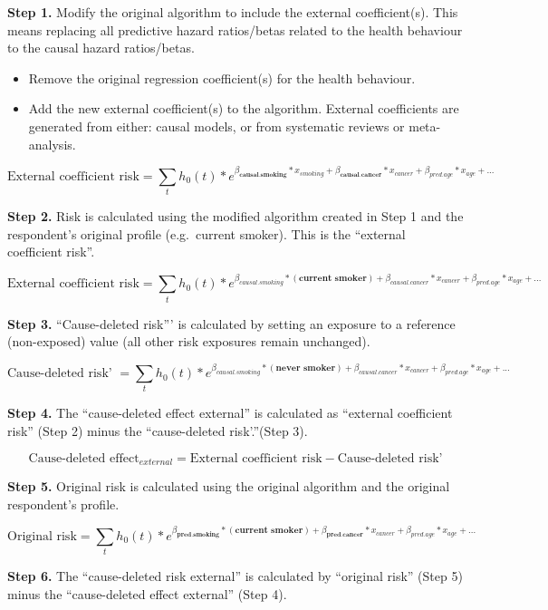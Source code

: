 \documentclass[]{book}
\providecommand{\tightlist}{%
  \setlength{\itemsep}{0pt}\setlength{\parskip}{0pt}}
\begin{document}
\textbf{Step 1.} Modify the original algorithm to include the external
coefficient(s). This means replacing all predictive hazard ratios/betas
related to the health behaviour to the causal hazard ratios/betas.

\begin{itemize}
\tightlist
\item
  Remove the original regression coefficient(s) for the health
  behaviour.
\item
  Add the new external coefficient(s) to the algorithm. External
  coefficients are generated from either: causal models, or from
  systematic reviews or meta-analysis.
\end{itemize}

\[ \text{External coefficient risk} = \sum_t h_0(t) * e^{{\beta_\textbf{causal.smoking}}*x_{smoking} + {{\beta_\textbf{causal.cancer}}}*x_{cancer} + \beta_{pred.age}*x_{age} +...}  \]

\textbf{Step 2.} Risk is calculated using the modified algorithm created
in Step 1 and the respondent's original profile (e.g.~current smoker).
This is the ``external coefficient risk''.

\[ \text{External coefficient risk} = \sum_t h_0(t) * e^{\beta_{causal.smoking}* {(\textbf{current smoker})} + \beta_{causal.cancer}*x_{cancer} + \beta_{pred.age}*x_{age} +...}  \]

\textbf{Step 3.} ``Cause-deleted risk''' is calculated by setting an
exposure to a reference (non-exposed) value (all other risk exposures
remain unchanged).

\[ \text{Cause-deleted risk' } = \sum_t h_0(t) * e^{\beta_{causal.smoking}* {(\textbf{never smoker})} + \beta_{causal.cancer}*x_{cancer} + \beta_{pred.age}*x_{age} +...}  \]

\textbf{Step 4.} The ``cause-deleted effect external'' is calculated as
``external coefficient risk'' (Step 2) minus the ``cause-deleted
risk'.''(Step 3).

\[\text{Cause-deleted effect}_{external} = \text{External coefficient risk} - \text{Cause-deleted risk'}\]

\textbf{Step 5.} Original risk is calculated using the original
algorithm and the original respondent's profile.

\[ \text{Original risk} = \sum_t h_0(t) * e^{{\beta_\textbf{pred.smoking}}*{(\textbf{current smoker})}+{\beta_\textbf{pred.cancer}}*x_{cancer} + \beta_{pred.age}*x_{age} +...}  \]

\textbf{Step 6.} The ``cause-deleted risk external'' is calculated by
``original risk'' (Step 5) minus the ``cause-deleted effect external''
(Step 4).
\end{document}
